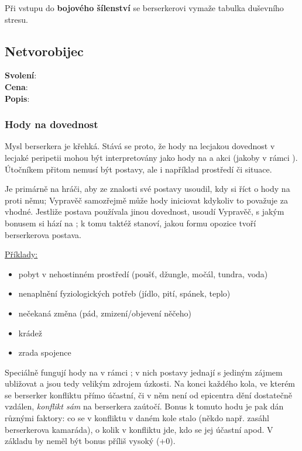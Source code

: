 \documentclass[../main.tex]{subfiles}
\begin{document}
\begin{prozatimni}[Berserker]
Při vstupu do \textbf{bojového šílenství} se berserkerovi vymaže tabulka duševního stresu.
\end{prozatimni}
\begin{povolani}
\subsection{Netvorobijec}
\label{sec:pov-netvorobijec}
\textbf{Svolení}:\\
\textbf{Cena}:\\
\textbf{Popis}:\\
\end{povolani}

\subsubsection*{Hody na dovednost }
Mysl berserkera je křehká. Stává se proto, že hody na lecjakou dovednost v lecjaké peripetii mohou být interpretovány jako hody na  a akci  (jakoby v rámci ). Útočníkem přitom nemusí být postavy, ale i například prostředí či situace.

Je primárně na hráči, aby ze znalosti své postavy usoudil, kdy si říct o hody na  proti němu; Vypravěč samozřejmě může hody iniciovat kdykoliv to považuje za vhodné. Jestliže postava používala jinou dovednost, usoudí Vypravěč, s jakým bonusem si hází na ; k tomu taktéž stanoví, jakou formu opozice tvoří berserkerova postava.

\underline{Příklady:}
\begin{itemize}
\item pobyt v nehostinném prostředí (poušť, džungle, močál, tundra, voda)
\item nenaplnění fyziologických potřeb (jídlo, pití, spánek, teplo)
\item nečekaná změna (pád, zmizení/objevení něčeho)
\item krádež
\item zrada spojence
\end{itemize}

Speciálně fungují hody na  v rámci ; v nich postavy jednají s jediným zájmem ubližovat a jsou tedy velikým zdrojem úzkosti. Na konci každého kola, ve kterém se berserker konfliktu přímo účastní, či v něm není od epicentra dění dostatečně vzdálen, \textit{konflikt sám} na berserkera  zaútočí. Bonus k tomuto hodu je pak dán různými faktory: co se v konfliktu v daném kole stalo (někdo např. zasáhl berserkerova kamaráda), o kolik v konfliktu jde, kdo se jej účastní apod. V základu by neměl být bonus příliš vysoký (+0).
\end{document}
